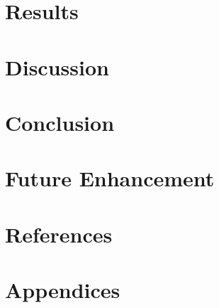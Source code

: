 \documentclass[a4paper]{report}
\begin{document}
\chapter{Results}
\chapter{Discussion}
\chapter{Conclusion}
\chapter{Future Enhancement}
\chapter{References}
\chapter{Appendices}
\end{document}
